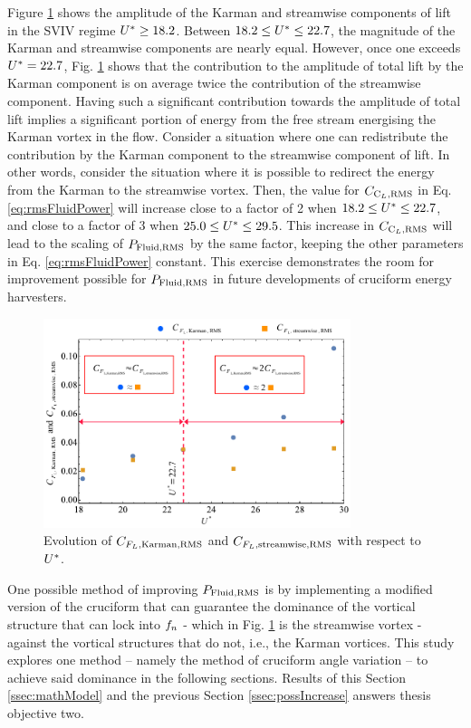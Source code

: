 \documentclass[oneside]{utmthesis}
\begin{document}
Figure \ref{fig:karmanStreamwiseComponents} shows the \rms{} amplitude of the Karman and streamwise components of lift in the SVIV regime $U^{*} \geq 18.2$. Between $18.2 \leq U^{*} \leq 22.7$, the magnitude of the Karman and streamwise components are nearly equal. However, once one exceeds $U^{*} = 22.7$, Fig. \ref{fig:karmanStreamwiseComponents} shows that the contribution to the \rms{} amplitude of total lift by the Karman component is on average twice the contribution of the streamwise component. Having such a significant contribution towards the \rms{} amplitude of total lift implies a significant portion of energy from the free stream energising the Karman vortex in the flow. Consider a situation where one can redistribute the contribution by the Karman component to the streamwise component of lift. In other words, consider the situation where it is possible to redirect the energy from the Karman to the streamwise vortex. Then, the value for $C_{\text{C}_{L},\text{RMS}}$ in Eq. \ref{eq:rmsFluidPower} will increase close to a factor of 2 when $18.2 \leq U^{*} \leq 22.7$, and close to a factor of 3 when $25.0 \leq U^{*} \leq 29.5$. This increase in $C_{\text{C}_{L},\text{RMS}}$ will lead to the scaling of $P_{\text{Fluid,RMS}}$ by the same factor, keeping the other parameters in Eq. \ref{eq:rmsFluidPower} constant. This exercise demonstrates the room for improvement possible for $P_{\text{Fluid,RMS}}$ in future developments of cruciform energy harvesters.

\begin{figure}[H]
  \centering
  \includegraphics[width=0.8\textwidth]{figs/karmanStreamwiseComponents}
  \caption{Evolution of $C_{F_{L},\text{Karman},\text{RMS}}$ and $C_{F_{L},\text{streamwise},\text{RMS}}$ with respect to $U^{*}$.}
  \label{fig:karmanStreamwiseComponents}
\end{figure}

One possible method of improving $P_{\text{Fluid,RMS}}$ is by implementing a modified version of the cruciform that can guarantee the dominance of the vortical structure that can lock into $f_{n}$ - which in Fig. \ref{fig:karmanStreamwiseComponents} is the streamwise vortex - against the vortical structures that do not, i.e., the Karman vortices. This study explores one method -- namely the method of cruciform angle variation -- to achieve said dominance in the following sections. Results of this Section \ref{ssec:mathModel} and the previous Section \ref{ssec:possIncrease} answers thesis objective two.
\end{document}
